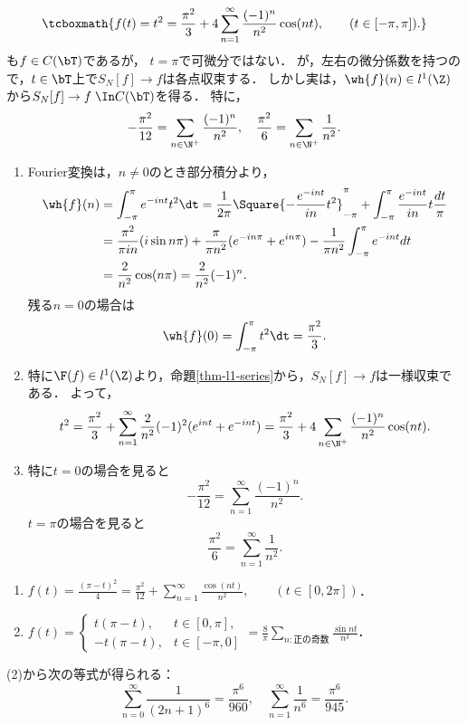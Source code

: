 \documentclass[uplatex,dvipdfmx]{jsreport}
\begin{document}
\begin{example}[冪関数]
    \[\tcboxmath{f(t)=t^2=\frac{\pi^2}{3}+4\sum_{n=1}^\infty\frac{(-1)^n}{n^2}\cos(nt),\qquad(t\in[-\pi,\pi]).}\]
    も$f\in C(\bT)$であるが，
    $t=\pi$で可微分ではない．
    が，左右の微分係数を持つので，$t\in\bT$上で$S_N[f]\to f$は各点収束する．
    しかし実は，$\wh{f}(n)\in l^1(\Z)$から$S_N[f]\to f\;\In C(\bT)$を得る．
    特に，
    \[-\frac{\pi^2}{12}=\sum_{n\in\N^+}\frac{(-1)^n}{n^2},\quad\frac{\pi^2}{6}=\sum_{n\in\N^+}\frac{1}{n^2}.\]
\end{example}
\begin{Proof}\mbox{}
    \begin{enumerate}
        \item Fourier変換は，$n\ne0$のとき部分積分より，
        \begin{align*}
            \wh{f}(n)&=\int^\pi_{-\pi}e^{-int}t^2\dt=\frac{1}{2\pi}\Square{-\frac{e^{-int}}{in}t^2}^\pi_{-\pi}+\int^\pi_{-\pi}\frac{e^{-int}}{in}t\frac{dt}{\pi}\\
            &=\frac{\pi^2}{\pi in}(i\sin n\pi)+\frac{\pi}{\pi n^2}(e^{-in\pi}+e^{in\pi})-\frac{1}{\pi n^2}\int^\pi_{-\pi}e^{-int}dt\\
            &=\frac{2}{n^2}\cos(n\pi)=\frac{2}{n^2}(-1)^n.
        \end{align*}
        残る$n=0$の場合は
        \[\wh{f}(0)=\int^\pi_{-\pi}t^2\dt=\frac{\pi^2}{3}.\]
        \item 特に$\F(f)\in l^1(\Z)$より，命題\ref{thm-l1-series}から，$S_N[f]\to f$は一様収束である．
        よって，
        \[t^2=\frac{\pi^2}{3}+\sum_{n=1}^\infty\frac{2}{n^2}(-1)^2(e^{int}+e^{-int})=\frac{\pi^2}{3}+4\sum_{n\in\N^+}\frac{(-1)^n}{n^2}\cos(nt).\]
        \item 特に$t=0$の場合を見ると
        \[-\frac{\pi^2}{12}=\sum_{n=1}^\infty\frac{(-1)^n}{n^2}.\]
        $t=\pi$の場合を見ると
        \[\frac{\pi^2}{6}=\sum_{n=1}^\infty\frac{1}{n^2}.\]
    \end{enumerate}
\end{Proof}

\begin{example}[冪関数の修正]\mbox{}
    \begin{enumerate}
        \item $f(t)=\frac{(\pi-t)^2}{4}=\frac{\pi^2}{12}+\sum_{n=1}^\infty\frac{\cos(nt)}{n^2},\qquad(t\in[0,2\pi])$．
        \item $f(t)=\begin{cases}
            t(\pi-t),&t\in[0,\pi],\\
            -t(\pi-t),&t\in[-\pi,0]
        \end{cases}=\frac{8}{\pi}\sum_{n:\text{正の奇数}}\frac{\sin nt}{n^3}$．
    \end{enumerate}
    (2)から次の等式が得られる：
    \[\sum_{n=0}^\infty\frac{1}{(2n+1)^6}=\frac{\pi^6}{960},\quad\sum_{n=1}^\infty\frac{1}{n^6}=\frac{\pi^6}{945}.\]
\end{example}
\end{document}
